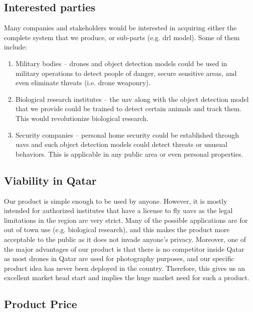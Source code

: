 \documentclass[../main.tex]{subfiles}
\begin{document}
\subsection{Interested parties}
	Many companies and stakeholders would be interested in acquiring either the
	complete system that we produce, or sub-parts (e.g. \gls{drl} model). Some of them include:
	\begin{enumerate}
		\item Military bodies -- drones and object detection models could 
		be used in military operations to detect people of danger, secure 
		sensitive areas, and even eliminate threats (i.e. drone weaponry).
		
		\item Biological research institutes -- 
                    the \gls{uav} along with the object
		detection model that we provide could be trained to detect certain animals 
		and track them. This would revolutionize biological research.
		
		\item Security companies -- personal home security could be established through
		\glspl{uav} and such object detection models could detect threats or unusual
		behaviors. This is applicable in any public area or even personal properties.		
		
	\end{enumerate}

\subsection{Viability in Qatar}
	Our product is simple enough to be used by anyone. However, it is mostly intended for 
	authorized institutes that have a license to fly \glspl{uav} as the legal limitations 
	in the region are very strict. 
	Many of the possible applications are for out of town use (e.g. biological research), 
	and this makes the product more acceptable to the public as it does not invade anyone's privacy.
	Moreover, one of the major advantages of our product is that there is no competitor 
	inside Qatar as most drones in Qatar are used for photography purposes, and our
	specific product idea has never been deployed in the country. Therefore, this gives us an excellent 
	market head start and implies the huge market need for such a product.

\subsection{Product Price}
\end{document}
